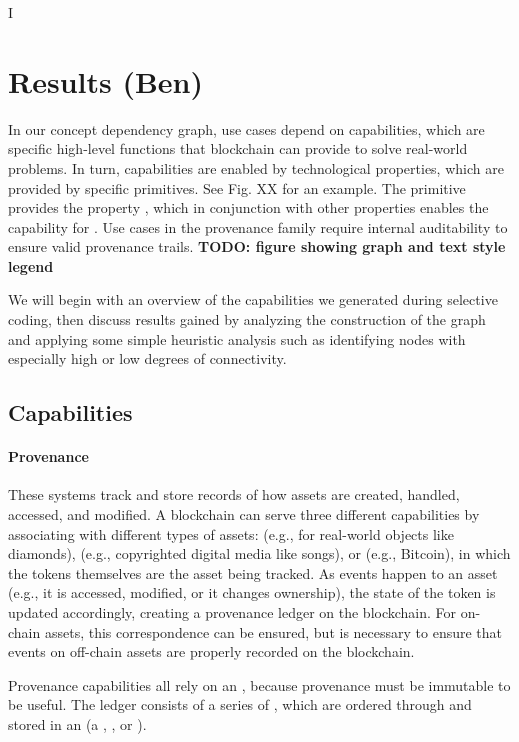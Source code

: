 I\section{Results (Ben)}
In our concept dependency graph, use cases depend on capabilities, which are specific high-level functions that blockchain can provide to solve real-world problems. In turn, capabilities are enabled by technological properties, which are provided by specific primitives. See Fig. XX for an example.  The primitive  provides the property , which in conjunction with other properties enables the capability for . Use cases in the provenance family require internal auditability to ensure valid provenance trails.
\textbf{TODO: figure showing graph and text style legend}

We will begin with an overview of the capabilities we generated during selective coding, then discuss results gained by analyzing the construction of the graph and applying some simple heuristic analysis such as identifying nodes with especially high or low degrees of connectivity.

\subsection{Capabilities}
\paragraph{Provenance} These systems track and store records of how assets are created, handled, accessed, and modified. A blockchain can serve three different capabilities by associating  with different types of assets:  (e.g., for real-world objects like diamonds),  (e.g., copyrighted digital media like songs), or  (e.g., Bitcoin), in which the tokens themselves are the asset being tracked. As events happen to an asset (e.g., it is accessed, modified, or it changes ownership), the state of the token is updated accordingly, creating a provenance ledger on the blockchain. For on-chain assets, this correspondence can be ensured, but  is necessary to ensure that events on off-chain assets are properly recorded on the blockchain.

Provenance capabilities all rely on an , because provenance must be immutable to be useful. The ledger consists of a series of , which are ordered through  and stored in an  (a , , or ). 

